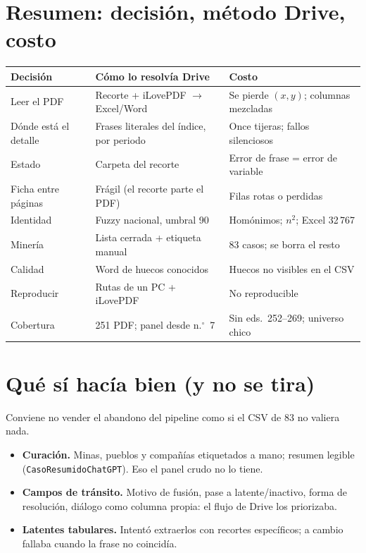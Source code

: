 \documentclass[11pt,a4paper]{article}
\begin{document}
\section{Resumen: decisión, método Drive, costo}

\begin{center}
\renewcommand{\arraystretch}{1.2}
\begin{tabularx}{\textwidth}{@{}l Y Y@{}}
\toprule
\textbf{Decisión} & \textbf{Cómo lo resolvía Drive} & \textbf{Costo} \\
\midrule
Leer el PDF & Recorte + iLovePDF $\to$ Excel/Word & Se pierde $(x,y)$; columnas mezcladas \\
Dónde está el detalle & Frases literales del índice, por periodo & Once tijeras; fallos silenciosos \\
Estado & Carpeta del recorte & Error de frase = error de variable \\
Ficha entre páginas & Frágil (el recorte parte el PDF) & Filas rotas o perdidas \\
Identidad & Fuzzy nacional, umbral 90 & Homónimos; $n^2$; Excel 32\,767 \\
Minería & Lista cerrada + etiqueta manual & 83 casos; se borra el resto \\
Calidad & Word de huecos conocidos & Huecos no visibles en el CSV \\
Reproducir & Rutas de un PC + iLovePDF & No reproducible \\
Cobertura & 251 PDF; panel desde n.$^\circ$~7 & Sin eds.\ 252--269; universo chico \\
\bottomrule
\end{tabularx}
\end{center}

\section{Qué sí hacía bien (y no se tira)}

Conviene no vender el abandono del pipeline como si el CSV de 83 no valiera nada.

\begin{itemize}
  \item \textbf{Curación.} Minas, pueblos y compañías etiquetados a mano; resumen legible (\texttt{CasoResumidoChatGPT}). Eso el panel crudo no lo tiene.
  \item \textbf{Campos de tránsito.} Motivo de fusión, pase a latente/inactivo, forma de resolución, diálogo como columna propia: el flujo de Drive los priorizaba.
  \item \textbf{Latentes tabulares.} Intentó extraerlos con recortes específicos; a cambio fallaba cuando la frase no coincidía.
\end{itemize}
\end{document}
